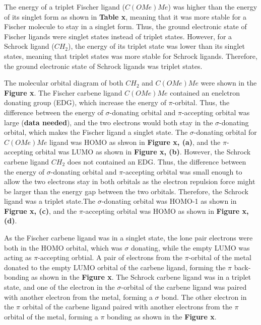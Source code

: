 \documentclass[twocolumn]{article} %
\begin{document}
The energy of a triplet Fischer ligand ($C(OMe)Me$) was higher than the energy of its singlet form as shown in \textbf{Table x}, meaning that it was more stable for a Fischer molecule to stay in a singlet form. Thus, the ground electronic state of Fischer ligands were singlet states instead of triplet states. However, for a Schrock ligand ($CH_2$), the energy of its triplet state was lower than its singlet states, meaning that triplet states was more stable for Schrock ligands. Therefore, the ground electronic state of Schrock ligands was triplet states. 

The molecular orbital diagram of both $CH_2$ and $C(OMe)Me$ were shown in the \textbf{Figure x}. The Fischer carbene ligand $C(OMe)Me$ contained an enelctron donating group (EDG), which increase the energy of $\pi$-orbital. Thus, the difference between the energy of $\sigma$-donating orbital and $\pi$-accepting orbital was large (\textbf{data needed}), and the two electrons would both stay in the $\sigma$-donating orbital, which makes the Fischer ligand a singlet state. 
The $\sigma$-donating orbital for $C(OMe)Me$ ligand was HOMO as shwon in \textbf{Figure x, (a)}, and the $\pi$-accepting orbital was LUMO as shown in \textbf{Figure x, (b)}.
However, the Schrock carbene ligand $CH_2$ does not contained an EDG. Thus, the difference between the energy of $\sigma$-donating orbital and $\pi$-accepting orbital was small enough to allow the two electrons stay in both orbitals as the electron repulsion force might be larger than the energy gap between the two orbitals. Therefore, the Schrock ligand was a triplet state.The $\sigma$-donating orbital was HOMO-1  as shown in \textbf{Figrue x, (c)}, and the $\pi$-accepting orbital was HOMO as shown in \textbf{Figure x, (d)}. 

As the Fischer carbene ligand was in a singlet state, the lone pair electrons were both in the HOMO orbital, which was $\sigma$ donating, while the empty LUMO was acting as $\pi$-accepting orbtial. A pair of electrons from the $\pi$-orbital of the metal donated to the empty LUMO orbital of the carbene ligand, forming the $\pi$ back-bonding as shown in the \textbf{Figure x}.
The Schrock carbene ligand was in a triplet state, and one of the electron in the $\sigma$-orbital of the carbene ligand was paired with another electron from the metal, forming a $\sigma$ bond. The other electron in the $\pi$ orbital of the carbene ligand paired with another electrons from the $\pi$ orbital of the metal, forming a $\pi$ bonding as shown in the \textbf{Figure x}.
\end{document}
